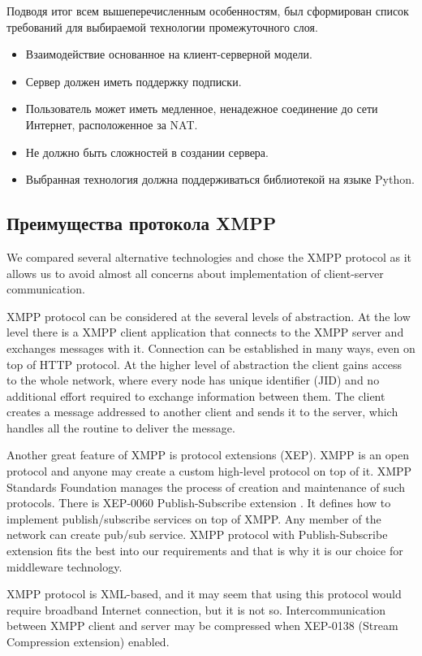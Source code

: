 Подводя итог всем вышеперечисленным особенностям, был сформирован список
требований для выбираемой технологии промежуточного слоя.
\begin{itemize}
\item Взаимодействие основанное на клиент-серверной модели.
\item Сервер должен иметь поддержку подписки.
\item Пользователь может иметь медленное, ненадежное соединение до
сети Интернет, расположенное за NAT.
\item Не должно быть сложностей в создании сервера.
\item Выбранная технология должна поддерживаться библиотекой на языке
Python.
\end{itemize}


\subsection{Преимущества протокола XMPP}
We compared several alternative technologies and chose the XMPP protocol as it
allows us to avoid almost all concerns about implementation of client-server
communication.

XMPP protocol can be considered at the several levels of abstraction. At the low
level there is a XMPP client application that connects to the XMPP server and
exchanges messages with it. Connection can be established in many ways, even on
top of HTTP protocol. At the higher level of abstraction the client gains access
to the whole network, where every node has unique identifier (JID) and no
additional effort required to exchange information between them. The client
creates a message addressed to another client and sends it to the server, which
handles all the routine to deliver the message.

Another great feature of XMPP is protocol extensions (XEP). 
XMPP is an open protocol and anyone may create a custom high-level protocol on
top of it. XMPP Standards Foundation manages the process of creation and
maintenance of such protocols. There is XEP-0060 Publish-Subscribe extension
\cite{xep-0060}. It defines how to implement publish/subscribe services on top
of XMPP. Any member of the network can create pub/sub service. XMPP protocol
with Publish-Subscribe extension fits the best into our requirements and that is
why it is our choice for middleware technology.

XMPP protocol is XML-based, and it may seem that using this protocol would
require broadband Internet connection, but it is not so. Intercommunication
between XMPP client and server may be compressed when XEP-0138 (Stream
Compression extension) enabled.

